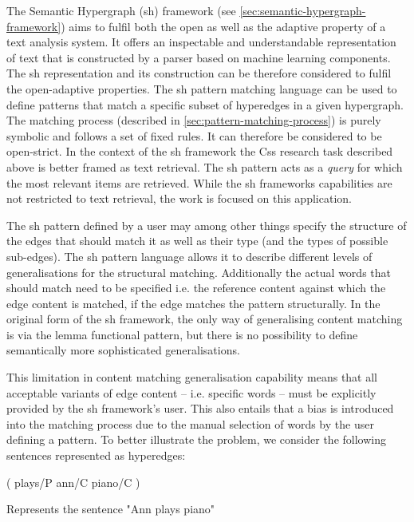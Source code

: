 \documentclass[11pt]{scrreprt}
\begin{document}
The Semantic Hypergraph (\gls{sh}) framework (see \cref{sec:semantic-hypergraph-framework}) aims to fulfil both the open as well as the adaptive property of a text analysis system. It offers an inspectable and understandable representation of text that is constructed by a parser based on machine learning components. The \gls{sh} representation and its construction can be therefore considered to fulfil the open-adaptive properties. The \gls{sh} pattern matching language can be used to define patterns that match a specific subset of hyperedges in a given hypergraph. The matching process (described in \cref{sec:pattern-matching-process}) is purely symbolic and follows a set of fixed rules. It can therefore be considered to be open-strict. In the context of the \gls{sh} framework the C\gls{ss} research task described above is better framed as text retrieval. The \gls{sh} pattern acts  as a \textit{query} for which the most relevant items are retrieved. While the \gls{sh} frameworks capabilities are not restricted to text retrieval, the work is focused on this application.

The \gls{sh} pattern defined by a user may among other things specify the structure of the edges that should match it as well as their type (and the types of possible sub-edges). The \gls{sh} pattern language allows it to describe different levels of generalisations for the structural matching. Additionally the actual words that should match need to be specified i.e. the reference content against which the edge content is matched, if the edge matches the pattern structurally. In the original form of the \gls{sh} framework, the only way of generalising content matching is via the lemma functional pattern, but there is no possibility to define semantically more sophisticated generalisations.

This limitation in content matching generalisation capability means that all acceptable variants of edge content -- i.e. specific words -- must be explicitly provided by the \gls{sh} framework's user. This also entails that a bias is introduced into the matching process due to the manual selection of words by the user defining a pattern. To better illustrate the problem, we consider the following sentences represented as hyperedges:

\begin{hedge}[h!]
  \normalfont\sffamily
  \centering
  ( plays/P ann/C piano/C ) 
  \caption{Represents the sentence "Ann plays piano"}
  \label{hed:ann-plays-piano}
\end{hedge}
\end{document}
